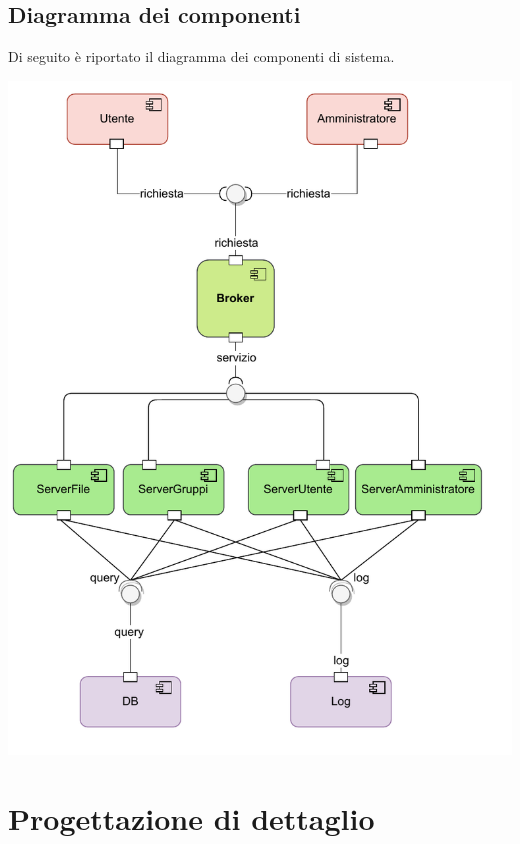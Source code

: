 \pagebreak
{}
\subsection*{Diagramma dei componenti}
Di seguito è riportato il diagramma dei componenti di sistema.
\vspace{2cm}
\begin{adjustwidth}{1cm}{0cm}
\includegraphics[scale=0.9]{progettazione/Progettazione-Diagramma Componenti.drawio.pdf}
\end{adjustwidth}
\vspace{1cm}


\pagebreak
{}
\section*{Progettazione di dettaglio}
\vspace{1cm}

